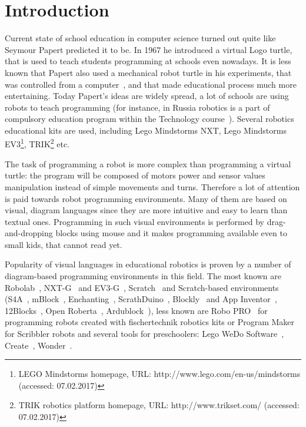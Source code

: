 \documentclass[conference]{IEEEtran}
\begin{document}
\section{Introduction}
\label{chapter:intro}
Current state of school education in computer science turned out quite like Seymour Papert predicted it to be. In 1967 he introduced a virtual Logo turtle, that is used to teach students programming at schools even nowadays. It is less known that Papert also used a mechanical robot turtle in his experiments, that was controlled from a computer~\cite{papert1980mindstorms}, and that made educational process much more entertaining. Today Papert's ideas are widely spread, a lot of schools are using robots to teach programming (for instance, in Russia robotics is a part of compulsory education program within the Technology course~\cite{лучин2016внедрение}). Several robotics educational kits are used, including Lego Mindstorms NXT, Lego Mindstorms EV3\footnote{LEGO Mindstorms homepage, URL: http://www.lego.com/en-us/mindstorms (accessed: 07.02.2017)}, TRIK\footnote{TRIK robotics platform homepage, URL: http://www.trikset.com/ (accessed: 07.02.2017)} etc.

The task of programming a robot is more complex than programming a virtual turtle: the program will be composed of motors power and sensor values manipulation instead of simple movements and turns. Therefore a lot of attention is paid towards robot programming environments. Many of them are based on visual, diagram languages since they are more intuitive and easy to learn than textual ones. Programming in such visual environments is performed by drag-and-dropping blocks using mouse and it makes programming available even to small kids, that cannot read yet. 

Popularity of visual languages in educational robotics is proven by a number of diagram-based programming environments in this field. The most known are Robolab~\cite{erwin2000lego}, NXT-G~\cite{kelly2010lego} and EV3-G~\cite{valk2014lego}, Scratch~\cite{resnick2009scratch} and Scratch-based environments (S4A~\cite{s4a}, mBlock~\cite{mblock}, Enchanting~\cite{enchanting}, ScrathDuino~\cite{scratchduino}, Blockly~\cite{blockly} and App Inventor~\cite{wolber2011app}, 12Blocks~\cite{12blocks}, Open Roberta~\cite{jost2014graphical}, Ardublock~\cite{ardublock}), less known are Robo PRO~\cite{chang2006incorporating} for programming robots created with fischertechnik robotics kits or Program Maker for Scribbler robots and several tools for preschoolers: Lego WeDo Software~\cite{mayerova2012pilot}, Create~\cite{cross2013visual}, Wonder~\cite{wonder}. 
\end{document}

